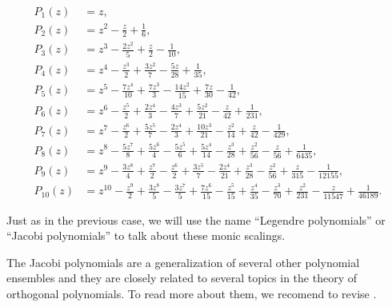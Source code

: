     \begin{align*}
        P_1(z) &= z,\\
        P_2(z) &= z^2 - \frac{z}{2} + \frac{1}{6}, \\
        P_3(z) &= z^3 - \frac{2z^2}{5} + \frac{z}{2} - \frac{1}{10},\\
        P_4(z) &= z^4 - \frac{z^3}{2} + \frac{3z^2}{7} - \frac{5z}{28} + \frac{1}{35},\\
        P_5(z) &= z^5 - \frac{7z^4}{10} + \frac{7z^3}{3} - \frac{14z^2}{15} + \frac{7z}{30} - \frac{1}{42},\\
        P_6(z) &= z^6 - \frac{z^5}{2} + \frac{2z^4}{3} - \frac{4z^3}{7} + \frac{5z^2}{21} - \frac{z}{42} + \frac{1}{231},\\
        P_7(z) &= z^7 - \frac{z^6}{2} + \frac{5z^5}{7} - \frac{2z^4}{3} + \frac{10z^3}{21} - \frac{z^2}{14} + \frac{z}{42} - \frac{1}{429},\\
        P_8(z) &= z^8 - \frac{5z^7}{8} + \frac{5z^6}{4} - \frac{5z^5}{6} + \frac{5z^4}{14} - \frac{z^3}{28} + \frac{z^2}{56} - \frac{z}{56} + \frac{1}{6435},\\
        P_9(z) &= z^9 - \frac{3z^8}{4} + \frac{z^7}{2} - \frac{z^6}{2} + \frac{3z^5}{7} - \frac{2z^4}{21} + \frac{z^3}{28} - \frac{z^2}{56} + \frac{z}{315} - \frac{1}{12155},\\
        P_{10}(z) &= z^{10} - \frac{z^9}{2} + \frac{3z^8}{5} - \frac{3z^7}{5} + \frac{7z^6}{15} - \frac{z^5}{15} + \frac{z^4}{35} - \frac{z^3}{70} + \frac{z^2}{231} - \frac{z}{11547} + \frac{1}{46189}.
    \end{align*}


    Just as in the previous case, we will use the name ``Legendre polynomials'' or ``Jacobi polynomials'' to talk about these monic scalings.

    The Jacobi polynomials are a generalization of several other polynomial ensembles and they are closely related to several topics in the theory of orthogonal polynomials. To read more about them, we recomend to revise \cite[Chapter IV]{szeg1939orthogonal}.